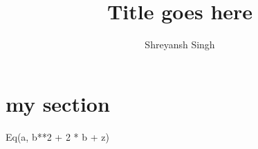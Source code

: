 \documentclass{article}
\title{Title goes here}
\author{Shreyansh Singh}
\begin{document}
\section{my section}
Eq(a, b**2 + 2 * b + z)
\end{document}
